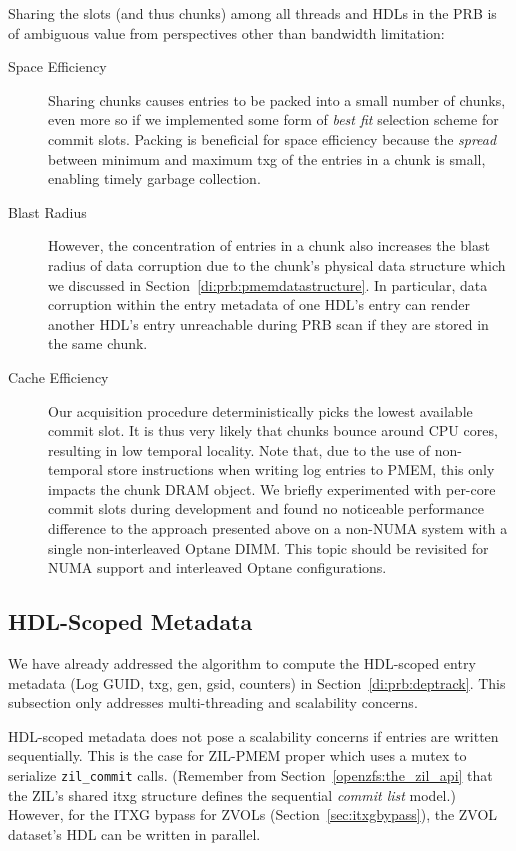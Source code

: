 \documentclass[12pt,a4paper,twoside]{book}
\begin{document}
Sharing the slots (and thus chunks) among all threads and HDLs in the PRB is of ambiguous value from perspectives other than bandwidth limitation:
\begin{description}
    \item[Space Efficiency]
        Sharing chunks causes entries to be packed into a small number of chunks, even more so if we implemented some form of \textit{best fit} selection scheme for commit slots.
        Packing is beneficial for space efficiency because the \textit{spread} between minimum and maximum txg of the entries in a chunk is small, enabling timely garbage collection.
    \item[Blast Radius]
        However, the concentration of entries in a chunk also increases the blast radius of data corruption due to the chunk's physical data structure which we discussed in Section~\ref{di:prb:pmemdatastructure}.
        In particular, data corruption within the entry metadata of one HDL's entry can render another HDL's entry unreachable during PRB scan if they are stored in the same chunk.
    \item[Cache Efficiency] Our acquisition procedure deterministically picks the lowest available commit slot.
        It is thus very likely that chunks bounce around CPU cores, resulting in low temporal locality.
        Note that, due to the use of non-temporal store instructions when writing log entries to PMEM, this only impacts the chunk DRAM object.
        We briefly experimented with per-core commit slots during development and found no noticeable performance difference to the approach presented above on a non-NUMA system with a single non-interleaved Optane DIMM.
        This topic should be revisited for NUMA support and interleaved Optane configurations.
\end{description}

\subsection{HDL-Scoped Metadata}\label{di:prb:write:hdlscoped}
We have already addressed the algorithm to compute the HDL-scoped entry metadata (Log GUID, txg, gen, gsid, counters) in Section~\ref{di:prb:deptrack}.
This subsection only addresses multi-threading and scalability concerns.

HDL-scoped metadata does not pose a scalability concerns if entries are written sequentially.
This is the case for ZIL-PMEM proper which uses a mutex to serialize \lstinline{zil_commit} calls.
(Remember from Section~\ref{openzfs:the_zil_api} that the ZIL's shared itxg structure defines the sequential \textit{commit list} model.)
However, for the ITXG bypass for ZVOLs (Section~\ref{sec:itxgbypass}), the ZVOL dataset's HDL can be written in parallel.
\end{document}
